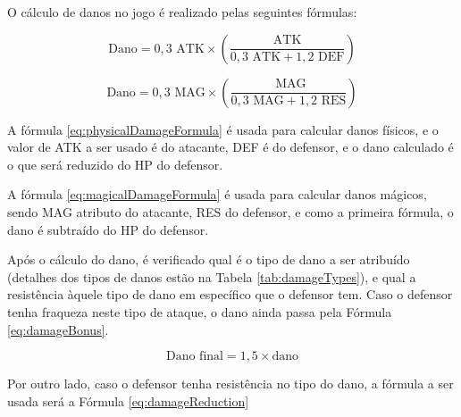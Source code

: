 \documentclass[12pt,a4paper]{article}
\begin{document}
	O cálculo de danos no jogo é realizado pelas seguintes fórmulas:
	
	\begin{equation}
		\textrm{Dano} = 0,3 \textrm{ ATK} \times \left(\frac{\textrm{ATK}}{0,3 \textrm{ ATK} + 1,2 \textrm{ DEF}}\right)
		\label{eq:physicalDamageFormula}
	\end{equation}
	
	\begin{equation}
		\textrm{Dano} = 0,3 \textrm{ MAG} \times \left(\frac{\textrm{ MAG}}{0,3 \textrm{ MAG} + 1,2 \textrm{ RES}}\right)
		\label{eq:magicalDamageFormula}
	\end{equation}
	
	\vspace{3mm}
	
	A fórmula \eqref{eq:physicalDamageFormula} é usada para calcular danos físicos,
	e o valor de ATK a ser usado é do atacante,
	DEF é do defensor,
	e o dano calculado é o que será reduzido do HP do defensor.
	
	A fórmula \eqref{eq:magicalDamageFormula} é usada para calcular danos mágicos,
	sendo MAG atributo do atacante,
	RES do defensor,
	e como a primeira fórmula, o dano é subtraído do HP do defensor.
	
	Após o cálculo do dano,
	é verificado qual é o tipo de dano a ser atribuído
	(detalhes dos tipos de danos estão na Tabela \ref{tab:damageTypes}),
	e qual a resistência àquele tipo de dano em específico que o defensor tem.
	Caso o defensor tenha fraqueza neste tipo de ataque,
	o dano ainda passa pela Fórmula \eqref{eq:damageBonus}.
	
	\begin{equation}
		\textrm{Dano final} = 1,5 \times \textrm{dano}
		\label{eq:damageBonus}
	\end{equation}
	
	\vspace{3mm}
	
	Por outro lado, caso o defensor tenha resistência no tipo do dano,
	a fórmula a ser usada será a Fórmula \eqref{eq:damageReduction}
	
\end{document}
